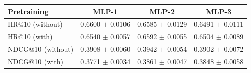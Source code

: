\begin{tabular}{lccc}
\toprule
Pretraining & MLP-1 & MLP-2 & MLP-3 \\
\midrule
HR@10 (without) & 0.6600 $\pm$ 0.0106 & 0.6585 $\pm$ 0.0129 & 0.6491 $\pm$ 0.0111 \\
HR@10 (with) & 0.6540 $\pm$ 0.0057 & 0.6592 $\pm$ 0.0055 & 0.6504 $\pm$ 0.0089 \\
\midrule
NDCG@10 (without) & 0.3908 $\pm$ 0.0060 & 0.3942 $\pm$ 0.0054 & 0.3902 $\pm$ 0.0072 \\
NDCG@10 (with) & 0.3771 $\pm$ 0.0034 & 0.3861 $\pm$ 0.0047 & 0.3848 $\pm$ 0.0058 \\
\bottomrule
\end{tabular}